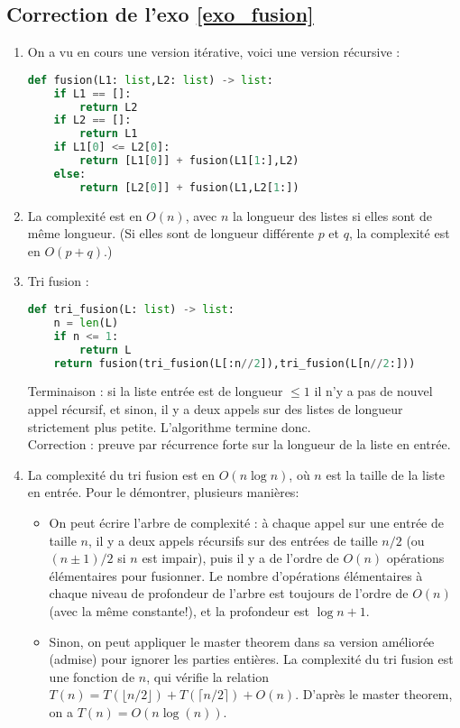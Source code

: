 \documentclass[11pt,a4paper]{article}
\begin{document}
\subsection*{Correction de l'exo \ref{exo_fusion}}

\begin{enumerate}
\item On a vu en cours une version itérative, voici une version récursive : 
\begin{lstlisting}[language=Python]
def fusion(L1: list,L2: list) -> list:
	if L1 == []:
		return L2
	if L2 == []:
		return L1
	if L1[0] <= L2[0]:
		return [L1[0]] + fusion(L1[1:],L2) 
	else:
		return [L2[0]] + fusion(L1,L2[1:])
\end{lstlisting}
\item La complexité est en $O(n)$, avec $n$ la longueur des listes si elles sont de même longueur. (Si elles sont de longueur différente $p$ et $q$, la complexité est en $O(p+q)$.)
\item Tri fusion : 
\begin{lstlisting}[language=Python]
def tri_fusion(L: list) -> list:
	n = len(L)
	if n <= 1:
		return L
	return fusion(tri_fusion(L[:n//2]),tri_fusion(L[n//2:]))
\end{lstlisting}
Terminaison : si la liste entrée est de longueur $\leq 1$ il n'y a pas de nouvel appel récursif, et sinon, il y a deux appels sur des listes de longueur strictement plus petite. L'algorithme termine donc.\\
Correction : preuve par récurrence forte sur la longueur de la liste en entrée.
\item La complexité du tri fusion est en $O(n \log n)$, où $n$ est  la taille de la liste en entrée. Pour le démontrer, plusieurs manières:
\begin{itemize}
\item On peut écrire l'arbre de complexité : à chaque appel sur une entrée de taille $n$, il y a deux appels récursifs sur des entrées de taille $n/2$ (ou $(n\pm 1)/2$ si $n$ est impair), puis il y a de l'ordre de $O(n)$ opérations élémentaires pour fusionner. Le nombre d'opérations élémentaires à chaque niveau de profondeur de l'arbre est toujours de l'ordre de $O(n)$ (avec la même constante!), et la profondeur est $\log n+1$.
\item Sinon, on peut appliquer le \og master theorem\fg{} dans sa version améliorée (admise) pour ignorer les parties entières. La complexité du tri fusion est une fonction de $n$, qui vérifie la relation $T(n) = T(\lfloor n/2\rfloor) + T(\lceil n/2 \rceil) + O(n)$. D'après le master theorem, on a $T(n) = O(n\log(n))$.
\end{itemize}
\end{enumerate}
\end{document}
